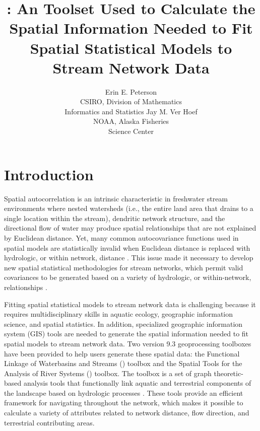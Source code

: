 \documentclass[article]{jss}
\author{Erin E. Peterson\\CSIRO, Division of Mathematics\\ Informatics and Statistics \And Jay M. Ver Hoef\\NOAA, Alaska Fisheries \\ Science Center}
\title{\pkg{STARS}: An \proglang{ArcGIS} Toolset Used to Calculate the Spatial Information Needed to Fit Spatial Statistical Models to Stream Network Data}
\begin{document}



%
%

\section{Introduction}

Spatial autocorrelation is an intrinsic characteristic in freshwater stream environments where nested watersheds (i.e., the entire land area that drains to a single location within the stream), dendritic network structure, and the directional flow of water may produce spatial relationships that are not explained by Euclidean distance. Yet, many common autocovariance functions used in spatial models are statistically invalid when Euclidean distance is replaced with hydrologic, or within network, distance \citep{Ver:Pete:Theo:spat:2006}. This issue made it necessary to develop new spatial statistical methodologies for stream networks, which permit valid covariances to be generated based on a variety of hydrologic, or within-network, relationships \citep{Ver:Pete:Move:2010}.

Fitting spatial statistical models to stream network data is challenging because it requires multidisciplinary skills in aquatic ecology, geographic information science, and spatial statistics. In addition, specialized geographic information system (GIS) tools are needed to generate the spatial information needed to fit spatial models to stream network data. Two  version 9.3 \citep{ESRI:ArcG:2009} geoprocessing toolboxes have been provided to help users generate these spatial data: the Functional Linkage of Waterbasins and Streams () toolbox \citep{Theo:Norm:Pete:Ferr:Wade:func:2006} and the Spatial Tools for the Analysis of River Systems () toolbox. The  toolbox is a set of graph theoretic-based analysis tools that functionally link aquatic and terrestrial components of the landscape based on hydrologic processes \citep{Theo:Norm:Pete:Ferr:Wade:func:2006}. These tools provide an efficient framework for navigating throughout the network, which makes it possible to calculate a variety of attributes related to network distance, flow direction, and terrestrial contributing areas.
\end{document}

